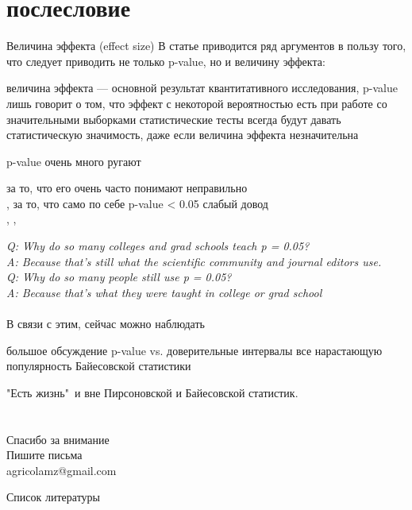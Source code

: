 \section{послесловие}
\begin{frame}{Величина эффекта (effect size)}
В статье \citep{sullivan12} приводится ряд аргументов в пользу того, что следует приводить не только p-value, но и величину эффекта:
\begin{itemize}
\mytem величина эффекта —  основной результат квантитативного исследования, p-value лишь говорит о том, что эффект с некоторой вероятностью есть
\mytem при работе со значительными выборками статистические тесты всегда будут давать статистическую значимость, даже если величина эффекта незначительна
\end{itemize}
\end{frame}
\begin{frame}{p-value очень много ругают}
\begin{itemize}
\mytem за то, что его очень часто понимают неправильно\\ \citep{gigerenzer04}, \citep{goodman08}
\mytem за то, что само по себе p-value < 0.05 слабый довод\\ \citep{sterne01}, \citep{nuzzo14}, \citep{wasserstein16}
\end{itemize}
\vfill
\small
\textit{Q: Why do so many colleges and grad schools teach p = 0.05?\\
A: Because that's still what the scientific community and journal editors use.\medskip\\
Q: Why do so many people still use p = 0.05?\\
A: Because that's what they were taught in college or grad school}\\\hfill
\normalsize \citep{wasserstein16}\\
\vfill
В связи с этим, сейчас можно наблюдать
\begin{itemize}
\mytem большое обсуждение p-value vs. доверительные интервалы
\mytem  все нарастающую популярность Байесовской статистики
 \end{itemize}
\vfill
"Есть жизнь"\ и вне Пирсоновской и Байесовской статистик.
\end{frame}
\section{}
\begin{frame}
{\huge Спасибо за внимание\bigskip\\
\normalsize Пишите письма\\
agricolamz@gmail.com
\vspace{-130pt}}
\end{frame}
\begin{frame}{Список литературы}
\footnotesize


\end{frame}

